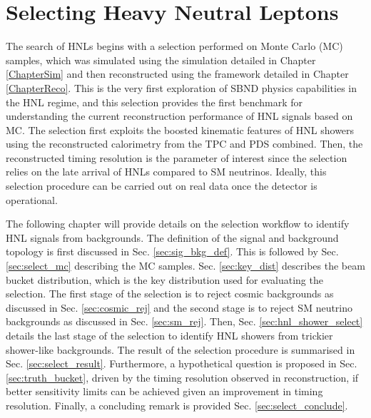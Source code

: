 \chapter{Selecting Heavy Neutral Leptons}
\label{ChapterSelect}

\ifpdf
    \graphicspath{{Chapter9/Figs/Raster/}{Chapter9/Figs/PDF/}{Chapter9/Figs/}}
\else
    \graphicspath{{Chapter9/Figs/Vector/}{Chapter9/Figs/}}
\fi


The search of HNLs begins with a selection performed on Monte Carlo (MC) samples, which was simulated using the simulation detailed in Chapter \ref{ChapterSim} and then reconstructed using the framework detailed in Chapter \ref{ChapterReco}.
This is the very first exploration of SBND physics capabilities in the HNL regime, and this selection provides the first benchmark for understanding the current reconstruction performance of HNL signals based on MC.
The selection first exploits the boosted kinematic features of HNL showers using the reconstructed calorimetry from the TPC and PDS combined.                                                                                 
Then, the reconstructed timing resolution is the parameter of interest since the selection relies on the late arrival of HNLs compared to SM neutrinos.
Ideally, this selection procedure can be carried out on real data once the detector is operational.

The following chapter will provide details on the selection workflow to identify HNL signals from backgrounds.
The definition of the signal and background topology is first discussed in Sec. \ref{sec:sig_bkg_def}.
This is followed by Sec. \ref{sec:select_mc} describing the MC samples.
Sec. \ref{sec:key_dist} describes the beam bucket distribution, which is the key distribution used for evaluating the selection.
The first stage of the selection is to reject cosmic backgrounds as discussed in Sec. \ref{sec:cosmic_rej} and 
the second stage is to reject SM neutrino backgrounds as discussed in Sec. \ref{sec:sm_rej}.                   
Then, Sec. \ref{sec:hnl_shower_select} details the last stage of the selection to identify HNL showers from trickier shower-like backgrounds.
The result of the selection procedure is summarised in Sec. \ref{sec:select_result}.                           
Furthermore, a hypothetical question is proposed in Sec. \ref{sec:truth_bucket}, driven by the timing resolution observed in reconstruction, if better sensitivity limits can be achieved given an improvement in timing resolution. 
Finally, a concluding remark is provided Sec. \ref{sec:select_conclude}.

